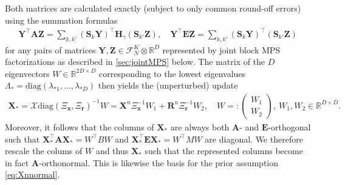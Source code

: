 \documentclass[a4paper,11pt,oneside]{amsart}
\theoremstyle{definition}
\theoremstyle{remark}
\newcommand{\A}{\ten A}
\newcommand{\E}{\ten E}
\newcommand{\R}{\mathbb{R}}
\newcommand{\ten}[1]{\boldsymbol{#1}}
\newcommand{\trp}{\top}
\numberwithin{equation}{section}
\numberwithin{theorem}{section}
\begin{document}
Both matrices are calculated exactly (subject to only common round-off errors) using the summation formulas
\begin{align*}
 \ten{Y^\trp} \A \ten{Z} = \sum_{k,k'} (\ten S_k \ten{Y})^\trp \ten H_\gamma (\ten S_{k'} \ten Z), \quad  \ten{Y^\trp} \E \ten{Z} = \sum_{k,k'} (\ten S_k \ten{Y})^\trp (\ten S_{k'} \ten Z)
\end{align*}
for any pairs of matrices $\ten Y, \ten Z \in \mathcal{F}_N^K \otimes \R^D$ represented by joint block MPS factorizations as described in \cref{sec:jointMPS} below.
The matrix of the $D$ eigenvectors $W \in \R^{2D \times D}$ corresponding to the lowest eigenvalues $\Lambda_\ast = \mathrm{diag}(\lambda_{\ast 1},\ldots,\lambda_{\ast D})$ then yields the (unperturbed) update
\begin{align*}
 \ten{X}_\ast = \ten{\mathcal{X}} \mathrm{diag}(\Xi_{\ten x},\Xi_{\ten r})^{-1} W
 = \ten{X}^n \Xi_{\ten x}^{-1} W_1 + \ten R^n \Xi_{\ten r}^{-1} W_2, \quad W =: \begin{pmatrix}
              W_1 \\                                                              
             W_2
\end{pmatrix}, \ W_1,W_2 \in \R^{D \times D}.
\end{align*}
Moreover, it follows that the columns of $\ten{X}_\ast$ are always both $\A$- and $\E$-orthogonal such that
%
$\ten X_\ast^\trp \A \ten X_\ast = W^\trp B W$ and $\ten X_\ast^\trp \E \ten X_\ast = W^\trp M W$ are diagonal. We therefore rescale the colums of $W$ and thus $\ten X_\ast$ such that the represented columns become in fact $\A$-orthonormal. This is likewise the basis for the prior assumption \cref{eq:Xnnormal}. 
%
\end{document}
